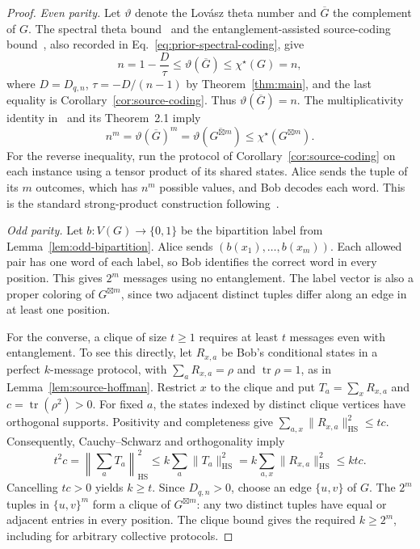 \documentclass[11pt,a4paper]{article}
\numberwithin{equation}{section}
\numberwithin{figure}{section}
\numberwithin{table}{section}
\numberwithin{footnote}{section}
\theoremstyle{informal}\newtheorem*{informaltheorem}{Informal theorem}
\theoremstyle{definition}\newtheorem{example}{Example}[section]
\theoremstyle{remark}\newtheorem{remark}[theorem]{Remark}
\newcommand{\chs}{\chi^{\star}}
\begin{document}
\begin{proof}
\emph{Even parity.}
Let \(\vartheta\) denote the Lov\'asz theta number and
\(\overline G\) the complement of \(G\). The spectral theta
bound~\cite[Sec.~2.1]{bdov} and the entanglement-assisted
source-coding bound~\cite[Theorem~2.1]{bblps}, also recorded in
Eq.~\eqref{eq:prior-spectral-coding}, give
\begin{equation}\label{eq:source-theta-tight}
 n=1-\frac D\tau
 \leq\vartheta(\overline G)\leq\chs(G)=n,
\end{equation}
where \(D=D_{q,n}\), \(\tau=-D/(n-1)\) by
Theorem~\ref{thm:main}, and the last equality is
Corollary~\ref{cor:source-coding}.
Thus \(\vartheta(\overline G)=n\). The multiplicativity identity
in~\cite[Eq.~(10)]{bblps} and its Theorem~2.1 imply
\begin{equation}
 n^m=\vartheta(\overline G)^m
 =\vartheta\!\left(\overline{G^{\boxtimes m}}\right)
 \leq\chs\!\left(G^{\boxtimes m}\right).
\end{equation}
For the reverse inequality, run the protocol of
Corollary~\ref{cor:source-coding} on each instance using a tensor
product of its shared states. Alice sends the tuple of its \(m\)
outcomes, which has \(n^m\) possible values, and Bob decodes each
word. This is the standard strong-product construction
following~\cite[Definition~1.5]{bblps}.

\emph{Odd parity.}
Let \(b:V(G)\to\{0,1\}\) be the bipartition label from
Lemma~\ref{lem:odd-bipartition}. Alice sends
\((b(x_1),\ldots,b(x_m))\). Each allowed pair has one word of
each label, so Bob identifies the correct word in every position.
This gives \(2^m\) messages using no entanglement. The label vector
is also a proper coloring of \(G^{\boxtimes m}\), since two adjacent
distinct tuples differ along an edge in at least one position.

For the converse, a clique of size \(t\geq1\) requires at least \(t\)
messages even with entanglement. To see this directly, let
\(R_{x,a}\) be Bob's conditional states in a perfect \(k\)-message
protocol, with \(\sum_a R_{x,a}=\rho\) and
\(\operatorname{tr}\rho=1\), as in
Lemma~\ref{lem:source-hoffman}. Restrict \(x\) to the clique and put
\(T_a=\sum_x R_{x,a}\) and \(c=\operatorname{tr}(\rho^2)>0\).
For fixed \(a\), the states indexed by distinct clique vertices have
orthogonal supports. Positivity and completeness give
\(\sum_{a,x}\|R_{x,a}\|_{\mathrm{HS}}^2\leq tc\).
Consequently, Cauchy--Schwarz and orthogonality imply
\begin{equation}\label{eq:block-clique-bound}
 t^2c=\left\|\sum_a T_a\right\|_{\mathrm{HS}}^2
 \leq k\sum_a\|T_a\|_{\mathrm{HS}}^2
 =k\sum_{a,x}\|R_{x,a}\|_{\mathrm{HS}}^2
 \leq ktc.
\end{equation}
Cancelling \(tc>0\) yields \(k\geq t\).
Since \(D_{q,n}>0\), choose an edge \(\{u,v\}\) of \(G\).
The \(2^m\) tuples in \(\{u,v\}^m\) form a clique of
\(G^{\boxtimes m}\): any two distinct tuples have equal or adjacent
entries in every position. The clique bound gives the required
\(k\geq2^m\), including for arbitrary collective protocols.


\end{proof}
\end{document}
